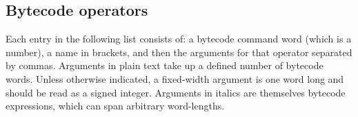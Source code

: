 \documentclass{article}
\begin{document}
\normalsize







\subsection{Bytecode operators}  

Each entry in the following list consists of:  a bytecode command word (which is a number), a name in brackets, and then the arguments for that operator separated by commas.  Arguments in plain text take up a defined number of bytecode words.  Unless otherwise indicated, a fixed-width argument is one word long and should be read as a signed integer.  Arguments in italics are themselves bytecode expressions, which can span arbitrary word-lengths.\\
\end{document}

